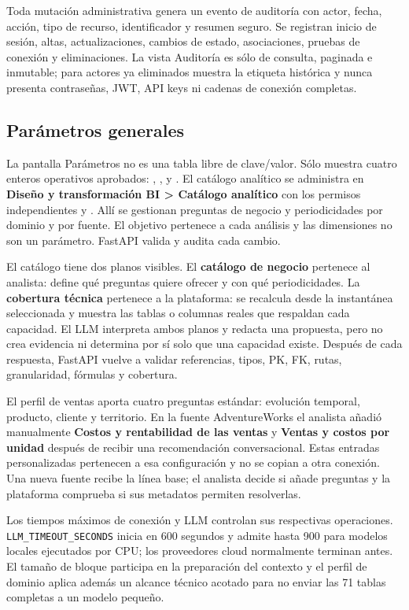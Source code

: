 \documentclass[11pt,letterpaper]{article}
\newcommand{\file}[1]{\texttt{#1}}
\begin{document}
Toda mutación administrativa genera un evento de auditoría con actor, fecha, acción, tipo de recurso, identificador y resumen seguro. Se registran inicio de sesión, altas, actualizaciones, cambios de estado, asociaciones, pruebas de conexión y eliminaciones. La vista Auditoría es sólo de consulta, paginada e inmutable; para actores ya eliminados muestra la etiqueta histórica y nunca presenta contraseñas, JWT, API keys ni cadenas de conexión completas.

\subsection{Parámetros generales}

La pantalla Parámetros no es una tabla libre de clave/valor. Sólo muestra cuatro enteros operativos aprobados: , ,  y . El catálogo analítico se administra en \textbf{Diseño y transformación BI > Catálogo analítico} con los permisos independientes  y . Allí se gestionan preguntas de negocio y periodicidades por dominio y por fuente. El objetivo pertenece a cada análisis y las dimensiones no son un parámetro. FastAPI valida y audita cada cambio.

El catálogo tiene dos planos visibles. El \textbf{catálogo de negocio} pertenece al analista: define qué preguntas quiere ofrecer y con qué periodicidades. La \textbf{cobertura técnica} pertenece a la plataforma: se recalcula desde la instantánea seleccionada y muestra las tablas o columnas reales que respaldan cada capacidad. El LLM interpreta ambos planos y redacta una propuesta, pero no crea evidencia ni determina por sí solo que una capacidad existe. Después de cada respuesta, FastAPI vuelve a validar referencias, tipos, PK, FK, rutas, granularidad, fórmulas y cobertura.

El perfil de ventas aporta cuatro preguntas estándar: evolución temporal, producto, cliente y territorio. En la fuente AdventureWorks el analista añadió manualmente \textbf{Costos y rentabilidad de las ventas} y \textbf{Ventas y costos por unidad} después de recibir una recomendación conversacional. Estas entradas personalizadas pertenecen a esa configuración y no se copian a otra conexión. Una nueva fuente recibe la línea base; el analista decide si añade preguntas y la plataforma comprueba si sus metadatos permiten resolverlas.

Los tiempos máximos de conexión y LLM controlan sus respectivas operaciones. \file{LLM\_TIMEOUT\_SECONDS} inicia en 600 segundos y admite hasta 900 para modelos locales ejecutados por CPU; los proveedores cloud normalmente terminan antes. El tamaño de bloque participa en la preparación del contexto y el perfil de dominio aplica además un alcance técnico acotado para no enviar las 71 tablas completas a un modelo pequeño.
\end{document}
